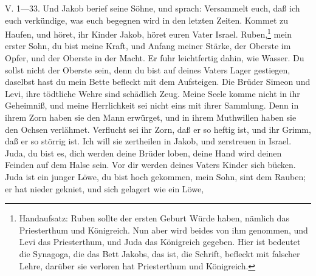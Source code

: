 \begin{schriftzitat}
V. 1—33. Und Jakob berief seine Söhne, und sprach: Versammelt euch, daß ich euch verkündige, was euch begegnen wird in den letzten Zeiten. Kommet zu Haufen, und höret, ihr Kinder Jakob, höret euren Vater Israel. Ruben,\footnote{Handaufsatz: Ruben sollte der ersten Geburt Würde haben, nämlich das Priesterthum und Königreich. Nun aber wird beides von ihm genommen, und Levi das Priesterthum, und Juda das Königreich gegeben. Hier ist bedeutet die Synagoga, die das Bett Jakobs, das ist, die Schrift, befleckt mit falscher Lehre, darüber sie verloren hat Priesterthum und Königreich.} mein erster Sohn, du bist meine Kraft, und Anfang meiner Stärke, der Oberste im Opfer, und der Oberste in der Macht. Er fuhr leichtfertig dahin, wie Wasser. Du sollst nicht der Oberste sein, denn du bist auf deines Vaters Lager gestiegen, daselbst hast du mein Bette befleckt mit dem Aufsteigen. Die Brüder Simeon und Levi, ihre tödtliche Wehre sind schädlich Zeug. Meine Seele komme nicht in ihr Geheimniß, und meine Herrlichkeit sei nicht eins mit ihrer Sammlung. Denn in ihrem Zorn haben sie den Mann erwürget, und in ihrem Muthwillen haben sie den Ochsen verlähmet. Verflucht sei ihr Zorn, daß er so heftig ist, und ihr Grimm, daß er so störrig ist. Ich will sie zertheilen in Jakob, und zerstreuen in Israel. Juda, du bist es, dich werden deine Brüder loben, deine Hand wird deinen Feinden auf dem Halse sein. Vor dir werden deines Vaters Kinder sich bücken. Juda ist ein junger Löwe, du bist hoch gekommen, mein Sohn, sint dem Rauben; er hat nieder gekniet, und sich gelagert wie ein Löwe,

\end{schriftzitat}
